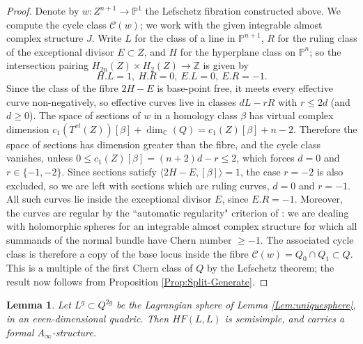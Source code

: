 \documentclass[reqno,10pt]{amsart}
\numberwithin{equation}{section}
\newcommand{\bC}{{\mathbb C}}
\newcommand{\bP}{{\mathbb P}}
\newcommand{\bZ}{{\mathbb Z}}
\newtheorem{Lemma}[thm]{Lemma}
\theoremstyle{remark}
\begin{document}
\begin{proof}
Denote by $w: Z^{n+1} \rightarrow \bP^1$ the Lefschetz fibration constructed above.  
We compute the cycle class $\mathcal{C}(w)$;   we work with the given integrable almost complex structure $J$. Write $L$ for the class of a line in $\bP^{n+1}$, $R$ for the ruling class of the exceptional divisor $E\subset Z$, and $H$ for the hyperplane class on $\bP^{n}$; so the intersection pairing $H_{2n}(Z)\times H_2(Z) \rightarrow \bZ$ is given by 
\[
H.L = 1, \ H.R = 0, \ E.L = 0, \ E.R=-1.
\]
Since the class of the fibre $2H-E$ is base-point free, it meets every effective curve non-negatively, so effective curves live in classes $dL-rR$ with $r\leq 2d$ (and $d\geq 0$). The space of sections of $w$ in a homology class $\beta$ has virtual complex  dimension $c_1(T^{vt}(Z))[\beta]+\dim_{\bC}(Q) = c_1(Z)[\beta]+n-2$.   Therefore the space of sections has dimension greater than the fibre, and the cycle class vanishes, unless $0 \leq c_1(Z)[\beta] = (n+2)d-r \leq 2$, which forces $d=0$ and $r\in \{-1,-2\}$.    Since sections satisfy $\langle 2H-E, [\beta]\rangle =1$, the case $r=-2$ is also excluded, so we are left with sections which are ruling curves,  $d=0$ and $r=-1$.  All such curves lie inside the exceptional divisor $E$, since $E.R = -1$.   Moreover, the curves are regular by the ``automatic regularity" criterion of \cite[Lemma 3.3.1]{McD-S}: we are dealing with holomorphic spheres for an integrable almost complex structure for which all summands of the normal bundle have Chern number $\geq -1$.  The associated cycle class is therefore a copy of the base locus inside the fibre $\mathcal{C}(w)=Q_0\cap Q_1\subset Q$.    This is a multiple of the first Chern class of $Q$ by the Lefschetz theorem; the result now follows from Proposition \ref{Prop:Split-Generate}.
\end{proof}

\begin{Lemma} \label{Lem:Ainfinitytrivial}
Let $L^g\subset Q^{2g}$ be the Lagrangian sphere of Lemma \ref{Lem:uniquesphere}, in an even-dimensional quadric.  Then $HF(L,L)$ is semisimple, and carries a formal $A_{\infty}$-structure.\end{Lemma}
\end{document}
